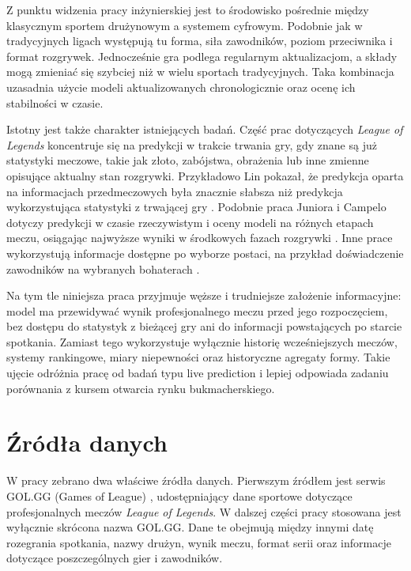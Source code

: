 Z punktu widzenia pracy inżynierskiej jest to środowisko pośrednie między klasycznym sportem
drużynowym a systemem cyfrowym. Podobnie jak w tradycyjnych ligach występują tu forma, siła
zawodników, poziom przeciwnika i format rozgrywek. Jednocześnie gra podlega regularnym
aktualizacjom, a składy mogą zmieniać się szybciej niż w wielu sportach tradycyjnych. Taka
kombinacja uzasadnia użycie modeli aktualizowanych chronologicznie oraz ocenę ich stabilności w
czasie.

Istotny jest także charakter istniejących badań. Część prac dotyczących \textit{League of Legends}
koncentruje się na predykcji w trakcie trwania gry, gdy znane są już statystyki meczowe, takie jak
złoto, zabójstwa, obrażenia lub inne zmienne opisujące aktualny stan rozgrywki. Przykładowo Lin
pokazał, że predykcja oparta na informacjach przedmeczowych była znacznie słabsza niż predykcja
wykorzystująca statystyki z trwającej gry \parencite{lin2016lol}. Podobnie praca Juniora i Campelo
dotyczy predykcji w czasie rzeczywistym i oceny modeli na różnych etapach meczu, osiągając najwyższe
wyniki w środkowych fazach rozgrywki \parencite{junior2023lol}. Inne prace wykorzystują informacje
dostępne po wyborze postaci, na przykład doświadczenie zawodników na wybranych bohaterach
\parencite{do2021championExperience}.

Na tym tle niniejsza praca przyjmuje węższe i trudniejsze założenie informacyjne: model ma
przewidywać wynik profesjonalnego meczu przed jego rozpoczęciem, bez dostępu do statystyk z bieżącej
gry ani do informacji powstających po starcie spotkania. Zamiast tego wykorzystuje wyłącznie
historię wcześniejszych meczów, systemy rankingowe, miary niepewności oraz historyczne agregaty
formy. Takie ujęcie odróżnia pracę od badań typu live prediction i lepiej odpowiada zadaniu
porównania z kursem otwarcia rynku bukmacherskiego.

\section{Źródła danych}

W pracy zebrano dwa właściwe źródła danych. Pierwszym źródłem jest serwis GOL.GG (Games of League)
\parencite{golgg}, udostępniający dane sportowe dotyczące profesjonalnych meczów \textit{League of
Legends}. W dalszej części pracy stosowana jest wyłącznie skrócona nazwa GOL.GG. Dane te obejmują
między innymi datę rozegrania spotkania, nazwy drużyn, wynik meczu, format serii oraz informacje
dotyczące poszczególnych gier i zawodników.

